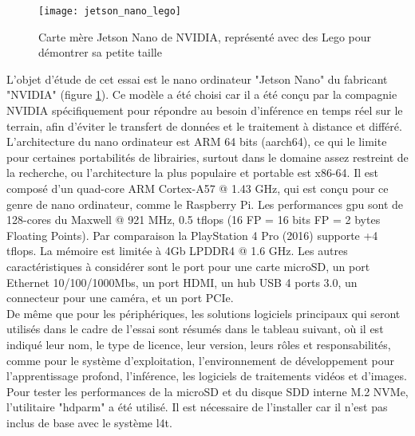 ﻿
\begin{figure}[H]
    \centering
    \texttt{[image: jetson\_nano\_lego]}
    \caption[Carte mère Jetson Nano de NVIDIA]{Carte mère Jetson Nano de NVIDIA, représenté avec des Lego pour démontrer sa petite taille}
    \label{fig:jetson_nano_lego}
\end{figure}
\noindent L'objet d'étude de cet essai est le nano ordinateur "Jetson Nano" du fabricant "NVIDIA" (figure \ref{fig:jetson_nano_lego}). Ce modèle a été choisi car il a été conçu par la compagnie NVIDIA spécifiquement pour répondre au besoin d'inférence en temps réel sur le terrain, afin d'éviter le transfert de données et le traitement à distance et différé. 
\vspace{\baselineskip}
\\
\noindent L'architecture du nano ordinateur est ARM 64 bits (aarch64), ce qui le limite pour certaines portabilités de librairies, surtout dans le domaine assez restreint de la recherche, ou l'architecture la plus populaire et portable est x86-64. Il est composé d'un quad-core ARM Cortex-A57 @ 1.43 GHz, qui est conçu pour ce genre de nano ordinateur, comme le Raspberry Pi. Les performances \acrshort{gpu} sont de 128-cores du Maxwell @ 921 MHz, 0.5 \acrshort{tflops} (16 FP = 16 bits FP = 2 bytes Floating Points). Par comparaison la PlayStation 4 Pro (2016) supporte +4 \acrshort{tflops}. La mémoire est limitée à 4Gb LPDDR4 @ 1.6 GHz. Les autres caractéristiques à considérer sont le port pour une carte microSD, un port Ethernet 10/100/1000Mbs, un port HDMI, un hub USB 4 ports 3.0, un connecteur pour une caméra, et un port PCIe.
\vspace{\baselineskip}
\\
\noindent De même que pour les périphériques, les solutions logiciels principaux qui seront utilisés dans le cadre de l'essai sont résumés dans le tableau suivant, où il est indiqué leur nom, le type de licence, leur version, leurs rôles et responsabilités, comme pour le système d'exploitation, l'environnement de développement pour l'apprentissage profond, l'inférence, les logiciels de traitements vidéos et d'images. 
\vspace{\baselineskip}
\\
\noindent Pour tester les performances de la microSD et du disque SDD interne M.2 NVMe, l'utilitaire "hdparm" a été utilisé. Il est nécessaire de l'installer car il n'est pas inclus de base avec le système \acrshort{l4t}.
\vspace{\baselineskip}
